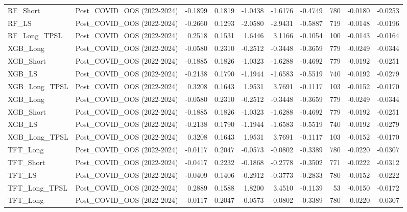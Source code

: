 \begin{tabular}{llrrrrrrrr}
\cline{1-10}
RF\_Short & Post\_COVID\_OOS (2022-2024) & -0.1899 & 0.1819 & -1.0438 & -1.6176 & -0.4749 & 780 & -0.0180 & -0.0253 \\
\cline{1-10}
RF\_LS & Post\_COVID\_OOS (2022-2024) & -0.2660 & 0.1293 & -2.0580 & -2.9431 & -0.5887 & 719 & -0.0148 & -0.0196 \\
\cline{1-10}
RF\_Long\_TPSL & Post\_COVID\_OOS (2022-2024) & 0.2518 & 0.1531 & 1.6446 & 3.1166 & -0.1054 & 100 & -0.0143 & -0.0164 \\
\cline{1-10}
XGB\_Long & Post\_COVID\_OOS (2022-2024) & -0.0580 & 0.2310 & -0.2512 & -0.3448 & -0.3659 & 779 & -0.0249 & -0.0344 \\
\cline{1-10}
XGB\_Short & Post\_COVID\_OOS (2022-2024) & -0.1885 & 0.1826 & -1.0323 & -1.6288 & -0.4692 & 779 & -0.0192 & -0.0251 \\
\cline{1-10}
XGB\_LS & Post\_COVID\_OOS (2022-2024) & -0.2138 & 0.1790 & -1.1944 & -1.6583 & -0.5519 & 740 & -0.0192 & -0.0279 \\
\cline{1-10}
XGB\_Long\_TPSL & Post\_COVID\_OOS (2022-2024) & 0.3208 & 0.1643 & 1.9531 & 3.7691 & -0.1117 & 103 & -0.0152 & -0.0170 \\
\cline{1-10}
XGB\_Long & Post\_COVID\_OOS (2022-2024) & -0.0580 & 0.2310 & -0.2512 & -0.3448 & -0.3659 & 779 & -0.0249 & -0.0344 \\
\cline{1-10}
XGB\_Short & Post\_COVID\_OOS (2022-2024) & -0.1885 & 0.1826 & -1.0323 & -1.6288 & -0.4692 & 779 & -0.0192 & -0.0251 \\
\cline{1-10}
XGB\_LS & Post\_COVID\_OOS (2022-2024) & -0.2138 & 0.1790 & -1.1944 & -1.6583 & -0.5519 & 740 & -0.0192 & -0.0279 \\
\cline{1-10}
XGB\_Long\_TPSL & Post\_COVID\_OOS (2022-2024) & 0.3208 & 0.1643 & 1.9531 & 3.7691 & -0.1117 & 103 & -0.0152 & -0.0170 \\
\cline{1-10}
TFT\_Long & Post\_COVID\_OOS (2022-2024) & -0.0117 & 0.2047 & -0.0573 & -0.0802 & -0.3389 & 780 & -0.0220 & -0.0307 \\
\cline{1-10}
TFT\_Short & Post\_COVID\_OOS (2022-2024) & -0.0417 & 0.2232 & -0.1868 & -0.2778 & -0.3502 & 771 & -0.0222 & -0.0312 \\
\cline{1-10}
TFT\_LS & Post\_COVID\_OOS (2022-2024) & -0.0409 & 0.1406 & -0.2912 & -0.3773 & -0.2833 & 780 & -0.0152 & -0.0222 \\
\cline{1-10}
TFT\_Long\_TPSL & Post\_COVID\_OOS (2022-2024) & 0.2889 & 0.1588 & 1.8200 & 3.4510 & -0.1139 & 53 & -0.0150 & -0.0172 \\
\cline{1-10}
TFT\_Long & Post\_COVID\_OOS (2022-2024) & -0.0117 & 0.2047 & -0.0573 & -0.0802 & -0.3389 & 780 & -0.0220 & -0.0307 \\

\end{tabular}
